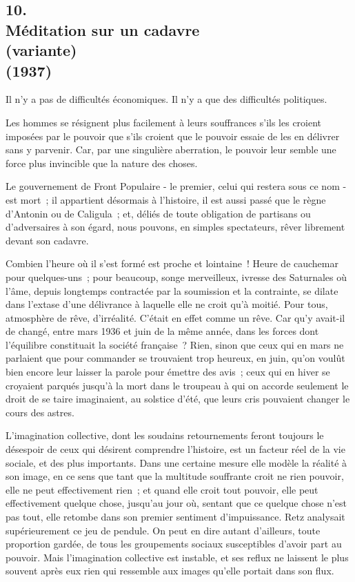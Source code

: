 \documentclass[french,twoside]{book} %
\begin{document}
\begin{center}
\end{center}
\subsection[10. Méditation sur un cadavre, (variante) (1937)]{10. \\
Méditation sur un cadavre \\
(variante) \\
(1937)}
\noindent \par
Il n'y a pas de difficultés économiques. Il n'y a que des difficultés politiques.\par
Les hommes se résignent plus facilement à leurs souffrances s'ils les croient imposées par le pouvoir que s'ils croient que le pouvoir essaie de les en délivrer sans y parvenir. Car, par une singulière aberration, le pouvoir leur semble une force plus invincible que la nature des choses.\par
Le gouvernement de Front Populaire - le premier, celui qui restera sous ce nom - est mort ; il appartient désormais à l'histoire, il est aussi passé que le règne d'Antonin ou de Caligula ; et, déliés de toute obligation de partisans ou d'adversaires à son égard, nous pouvons, en simples spectateurs, rêver librement devant son cadavre.\par
Combien l'heure où il s'est formé est proche et lointaine ! Heure de cauchemar pour quelques-uns ; pour beaucoup, songe merveilleux, ivresse des Saturnales où l'âme, depuis longtemps contractée par la soumission et la contrainte, se dilate dans l'extase d'une délivrance à laquelle elle ne croit qu'à moitié. Pour tous, atmosphère de rêve, d'irréalité. C'était en effet comme un rêve. Car qu'y avait-il de changé, entre mars 1936 et juin de la même année, dans les forces dont l'équilibre constituait la société française ? Rien, sinon que ceux qui en mars ne parlaient que pour commander se trouvaient trop heureux, en juin, qu'on voulût bien encore leur laisser la parole pour émettre des avis ; ceux qui en hiver se croyaient parqués jusqu'à la mort dans le troupeau à qui on accorde seulement le droit de se taire imaginaient, au solstice d'été, que leurs cris pouvaient changer le cours des astres.\par
L'imagination collective, dont les soudains retournements feront toujours le désespoir de ceux qui désirent comprendre l'histoire, est un facteur réel de la vie sociale, et des plus importants. Dans une certaine mesure elle modèle la réalité à son image, en ce sens que tant que la multitude souffrante croit ne rien pouvoir, elle ne peut effectivement rien ; et quand elle croit tout pouvoir, elle peut effectivement quelque chose, jusqu'au jour où, sentant que ce quelque chose n'est pas tout, elle retombe dans son premier sentiment d'im­puissance. Retz analysait supérieurement ce jeu de pendule. On peut en dire autant d'ailleurs, toute proportion gardée, de tous les groupements sociaux susceptibles d'avoir part au pouvoir. Mais l'imagination collective est instable, et ses reflux ne laissent le plus souvent après eux rien qui ressemble aux images qu'elle portait dans son flux.\par
\end{document}
